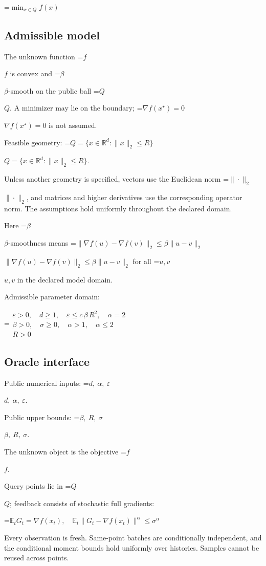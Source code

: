 \documentclass[10pt,a4paper]{article}
\newcommand{\AtlasMath}[1]{\par\begingroup\centering\setbox0=\hbox{$\displaystyle #1$}\ifdim\wd0>1.4\linewidth\typeout{ATLAS WIDE FORMULA: \the\wd0}\fi\ifdim\wd0>\linewidth\resizebox{\linewidth}{!}{\box0}\else\box0\fi\par\endgroup}
\newcommand{\AtlasInlineMath}[1]{\begingroup\setbox0=\hbox{$#1$}\ifdim\wd0>.4\linewidth\endgroup\AtlasMath{#1}\else\endgroup$#1$\fi}
\begin{document}
\AtlasMath{\min_{x\in Q}f(x)}


\subsection{Admissible model}
The unknown function \AtlasInlineMath{f} is convex and \AtlasInlineMath{\beta}-smooth on the public ball \AtlasInlineMath{Q}. A minimizer may lie on the boundary; \AtlasInlineMath{\nabla f(x^\star)=0} is not assumed.

Feasible geometry: \AtlasInlineMath{Q=\{x\in\mathbb{R}^d:\|x\|_2\le R\}}.

Unless another geometry is specified, vectors use the Euclidean norm \AtlasInlineMath{\|\cdot\|_2}, and matrices and higher derivatives use the corresponding operator norm. The assumptions hold uniformly throughout the declared domain.

Here \AtlasInlineMath{\beta}-smoothness means \AtlasInlineMath{\|\nabla f(u)-\nabla f(v)\|_2\le\beta\|u-v\|_2} for all \AtlasInlineMath{u,v} in the declared model domain.

Admissible parameter domain:


\AtlasMath{\begin{gathered}\varepsilon > 0,\quad d \ge 1,\quad \varepsilon \le c\,\beta\,{R}^{2},\quad \alpha = 2\\\beta > 0,\quad \sigma \ge 0,\quad \alpha > 1,\quad \alpha \le 2\\R > 0\end{gathered}}


\subsection{Oracle interface}
Public numerical inputs: \AtlasInlineMath{d,\ \alpha,\ \varepsilon}.

Public upper bounds: \AtlasInlineMath{\beta,\ R,\ \sigma}.

The unknown object is the objective \AtlasInlineMath{f}.

Query points lie in \AtlasInlineMath{Q}; feedback consists of stochastic full gradients:


\AtlasMath{\mathbb{E}_tG_t=\nabla f(x_t),\quad\mathbb{E}_t\|G_t-\nabla f(x_t)\|^\alpha\le\sigma^\alpha}


Every observation is fresh. Same-point batches are conditionally independent, and the conditional moment bounds hold uniformly over histories. Samples cannot be reused across points.
\end{document}
